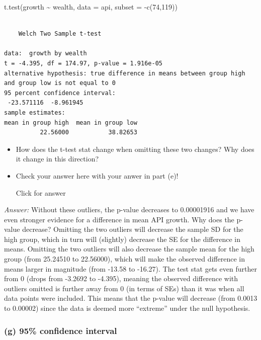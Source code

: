 \documentclass[
]{book}
\newenvironment{Shaded}{\begin{snugshade}}{\end{snugshade}}
\newcommand{\AttributeTok}[1]{\textcolor[rgb]{0.77,0.63,0.00}{#1}}
\newcommand{\DecValTok}[1]{\textcolor[rgb]{0.00,0.00,0.81}{#1}}
\newcommand{\FunctionTok}[1]{\textcolor[rgb]{0.00,0.00,0.00}{#1}}
\newcommand{\NormalTok}[1]{#1}
\newcommand{\SpecialCharTok}[1]{\textcolor[rgb]{0.00,0.00,0.00}{#1}}
\providecommand{\tightlist}{%
  \setlength{\itemsep}{0pt}\setlength{\parskip}{0pt}}
\begin{document}
\begin{Shaded}
\begin{Highlighting}[]
\FunctionTok{t.test}\NormalTok{(growth }\SpecialCharTok{\textasciitilde{}}\NormalTok{ wealth, }\AttributeTok{data =}\NormalTok{ api, }\AttributeTok{subset =} \SpecialCharTok{{-}}\FunctionTok{c}\NormalTok{(}\DecValTok{74}\NormalTok{,}\DecValTok{119}\NormalTok{))}
\end{Highlighting}
\end{Shaded}

\begin{verbatim}

    Welch Two Sample t-test

data:  growth by wealth
t = -4.395, df = 174.97, p-value = 1.916e-05
alternative hypothesis: true difference in means between group high and group low is not equal to 0
95 percent confidence interval:
 -23.571116  -8.961945
sample estimates:
mean in group high  mean in group low 
          22.56000           38.82653 
\end{verbatim}

\begin{itemize}
\tightlist
\item
  How does the t-test stat change when omitting these two changes? Why does it change in this direction?
\item
  Check your answer here with your anwer in part (e)!

  Click for answer
\end{itemize}

\emph{Answer:} Without these outliers, the p-value decreases to 0.00001916 and we have even stronger evidence for a difference in mean API growth. Why does the p-value decrease? Omitting the two outliers will decrease the sample SD for the high group, which in turn will (slightly) decrease the SE for the difference in means. Omitting the two outliers will also decrease the sample mean for the high group (from 25.24510 to 22.56000), which will make the observed difference in means larger in magnitude (from -13.58 to -16.27). The test stat gets even further from 0 (drops from -3.2692 to -4.395), meaning the observed difference with outliers omitted is further away from 0 (in terms of SEs) than it was when all data points were included. This means that the p-value will decrease (from 0.0013 to 0.00002) since the data is deemed more ``extreme'' under the null hypothesis.

\hypertarget{g-95-confidence-interval}{%
\subsubsection{(g) 95\% confidence interval}\label{g-95-confidence-interval}}
\end{document}
